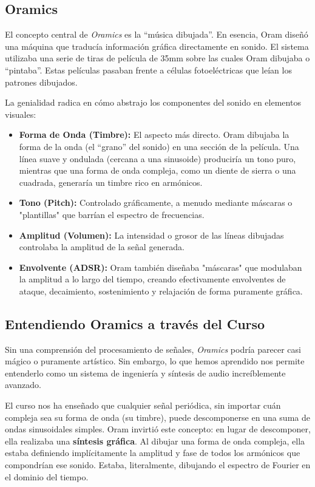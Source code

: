 \documentclass[paper=letter, fontsize=11pt, draft=false]{scrartcl}
\numberwithin{equation}{problemcounter} %
\numberwithin{figure}{problemcounter} %
\numberwithin{table}{problemcounter} %
\numberwithin{subsection}{problemcounter}
\begin{document}
\subsection{Oramics}

\noindent
El concepto central de \textit{Oramics} es la ``música dibujada''. En esencia, Oram diseñó una máquina que traducía información gráfica directamente en sonido. El sistema utilizaba una serie de tiras de película de 35mm sobre las cuales Oram dibujaba o ``pintaba''. Estas películas pasaban frente a células fotoeléctricas que leían los patrones dibujados.

La genialidad radica en cómo abstrajo los componentes del sonido en elementos visuales:

\begin{itemize}
    \item \textbf{Forma de Onda (Timbre):} El aspecto más directo. Oram dibujaba la forma de la onda (el ``grano'' del sonido) en una sección de la película. Una línea suave y ondulada (cercana a una sinusoide) produciría un tono puro, mientras que una forma de onda compleja, como un diente de sierra o una cuadrada, generaría un timbre rico en armónicos.
    \item \textbf{Tono (Pitch):} Controlado gráficamente, a menudo mediante máscaras o "plantillas" que barrían el espectro de frecuencias.
    \item \textbf{Amplitud (Volumen):} La intensidad o grosor de las líneas dibujadas controlaba la amplitud de la señal generada.
    \item \textbf{Envolvente (ADSR):} Oram también diseñaba "máscaras" que modulaban la amplitud a lo largo del tiempo, creando efectivamente envolventes de ataque, decaimiento, sostenimiento y relajación de forma puramente gráfica.
\end{itemize}

\subsection{Entendiendo Oramics a través del Curso}

Sin una comprensión del procesamiento de señales, \textit{Oramics} podría parecer casi mágico o puramente artístico. Sin embargo, lo que hemos aprendido nos permite entenderlo como un sistema de ingeniería y síntesis de audio increíblemente avanzado.

El curso nos ha enseñado que cualquier señal periódica, sin importar cuán compleja sea su forma de onda (su timbre), puede descomponerse en una suma de ondas sinusoidales simples. Oram invirtió este concepto: en lugar de descomponer, ella realizaba una \textbf{síntesis gráfica}. Al dibujar una forma de onda compleja, ella estaba definiendo implícitamente la amplitud y fase de todos los armónicos que compondrían ese sonido. Estaba, literalmente, dibujando el espectro de Fourier en el dominio del tiempo.
\end{document}
